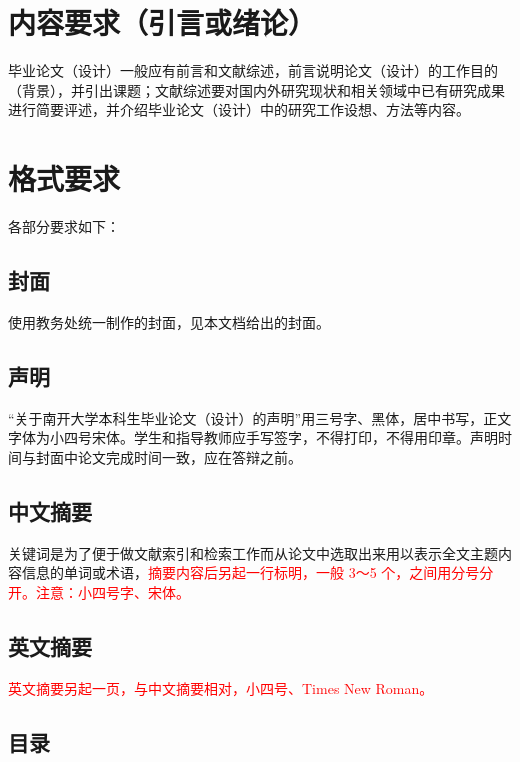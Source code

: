 
\chapter{内容要求（引言或绪论）} \label{chpt:intro}

毕业论文（设计）一般应有前言和文献综述，前言说明论文（设计）的工作目的（背景），并引出课题；文献综述要对国内外研究现状和相关领域中已有研究成果进行简要评述，并介绍毕业论文（设计）中的研究工作设想、方法等内容。

\chapter{格式要求} \label{chpt:format}

各部分要求如下：

\section{封面}

使用教务处统一制作的封面，见本文档给出的封面。

\section{声明}

“关于南开大学本科生毕业论文（设计）的声明”用三号字、黑体，居中书写，正文字体为小四号宋体。学生和指导教师应手写签字，不得打印，不得用印章。声明时间与封面中论文完成时间一致，应在答辩之前。

\section{中文摘要}

关键词是为了便于做文献索引和检索工作而从论文中选取出来用以表示全文主题内容信息的单词或术语，\textcolor{red}{摘要内容后另起一行标明，一般 3～5 个，之间用分号分开。注意：小四号字、宋体。}

\section{英文摘要}

\textcolor{red}{英文摘要另起一页，与中文摘要相对，小四号、Times New Roman。}

\section{目录}

